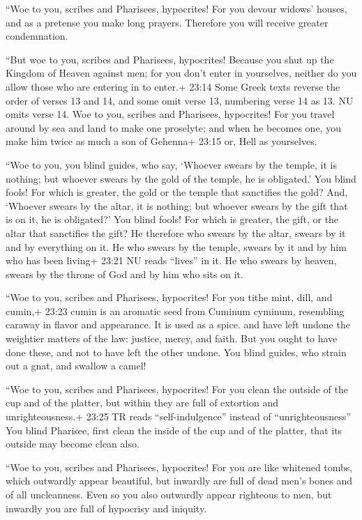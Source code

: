  ``Woe to you, scribes and Pharisees, hypocrites! For you
devour widows' houses, and as a pretense you make long prayers.
Therefore you will receive greater condemnation.

 ``But woe to you, scribes and Pharisees, hypocrites!
Because you shut up the Kingdom of Heaven against men; for you don't
enter in yourselves, neither do you allow those who are entering in to
enter.+ 23:14 Some Greek texts reverse the order of verses 13 and 14,
and some omit verse 13, numbering verse 14 as 13. NU omits verse 14.
 Woe to you, scribes and Pharisees, hypocrites! For you
travel around by sea and land to make one proselyte; and when he becomes
one, you make him twice as much a son of Gehenna+ 23:15 or, Hell as
yourselves.

 ``Woe to you, you blind guides, who say, `Whoever swears
by the temple, it is nothing; but whoever swears by the gold of the
temple, he is obligated.'  You blind fools! For which is
greater, the gold or the temple that sanctifies the gold? 
And, `Whoever swears by the altar, it is nothing; but whoever swears by
the gift that is on it, he is obligated?'  You blind fools!
For which is greater, the gift, or the altar that sanctifies the gift?
 He therefore who swears by the altar, swears by it and by
everything on it.  He who swears by the temple, swears by
it and by him who has been living+ 23:21 NU reads ``lives'' in it.
 He who swears by heaven, swears by the throne of God and
by him who sits on it.

 ``Woe to you, scribes and Pharisees, hypocrites! For you
tithe mint, dill, and cumin,+ 23:23 cumin is an aromatic seed from
Cuminum cyminum, resembling caraway in flavor and appearance. It is used
as a spice. and have left undone the weightier matters of the law:
justice, mercy, and faith. But you ought to have done these, and not to
have left the other undone.  You blind guides, who strain
out a gnat, and swallow a camel!

 ``Woe to you, scribes and Pharisees, hypocrites! For you
clean the outside of the cup and of the platter, but within they are
full of extortion and unrighteousness.+ 23:25 TR reads
``self-indulgence'' instead of ``unrighteousness''  You
blind Pharisee, first clean the inside of the cup and of the platter,
that its outside may become clean also.

 ``Woe to you, scribes and Pharisees, hypocrites! For you
are like whitened tombs, which outwardly appear beautiful, but inwardly
are full of dead men's bones and of all uncleanness.  Even
so you also outwardly appear righteous to men, but inwardly you are full
of hypocrisy and iniquity.

